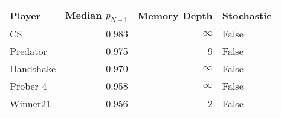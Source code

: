 \begin{tabular}{lrrl}
\toprule
    Player &  Median $p_{N-1}$ &  Memory Depth & Stochastic \\
\midrule
        CS &             0.983 &            \(\infty\) &      False \\
  Predator &             0.975 &             9 &      False \\
 Handshake &             0.970 &            \(\infty\) &      False \\
  Prober 4 &             0.958 &            \(\infty\) &      False \\
  Winner21 &             0.956 &             2 &      False \\
\bottomrule
\end{tabular}
